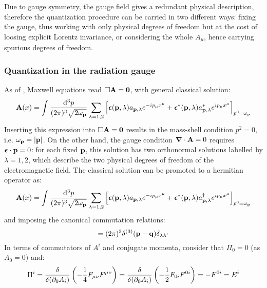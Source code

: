 Due to gauge symmetry, the gauge field gives a redundant physical description, therefore the quantization procedure can be carried in two different ways: fixing the gauge, thus working with only physical degrees of freedom but at the cost of loosing explicit Lorentz invariance, or considering the whole $ A_\mu $, hence carrying spurious degrees of freedom.

\subsubsection{Quantization in the radiation gauge}

As of , Maxwell equations  read $ \Box \mathbf{A} = \mathbf{0} $, with general classical solution:
\begin{equation*}
  \mathbf{A}(x) = \int \frac{\mathrm{d}^3p}{(2\pi)^3 \sqrt{2\omega_{\mathbf{p}}}} \sum_{\lambda = 1,2} \left[ \boldsymbol{\epsilon}(\mathbf{p},\lambda) a_{\mathbf{p},\lambda} e^{-i p_\mu x^\mu} + \boldsymbol{\epsilon}^*(\mathbf{p},\lambda)a^*_{\mathbf{p},\lambda} e^{i p_\mu x^\mu} \right]_{p^0 = \omega_{\mathbf{p}}}
\end{equation*}
Inserting this expression into $ \Box \mathbf{A} = \mathbf{0} $ results in the mass-shell condition $ p^2 = 0 $, i.e. $ \omega_{\mathbf{p}} = \left\lvert\mathbf{p}\right\rvert $. On the other hand, the gauge condition $ \boldsymbol{\nabla}\cdot \mathbf{A} = 0 $ requires $ \boldsymbol{\epsilon} \cdot \mathbf{p} = 0 $: for each fixed $ \mathbf{p} $, this solution has two orthonormal solutions labelled by $ \lambda = 1,2 $, which describe the two physical degrees of freedom of the electromagnetic field.
The classical solution can be promoted to a hermitian operator as:
\begin{equation}
  \mathbf{A}(x) = \int \frac{\mathrm{d}^3p}{(2\pi)^3 \sqrt{2\omega_{\mathbf{p}}}} \sum_{\lambda = 1,2} \left[ \boldsymbol{\epsilon}(\mathbf{p},\lambda) a_{\mathbf{p},\lambda} e^{-i p_\mu x^\mu} + \boldsymbol{\epsilon}^*(\mathbf{p},\lambda)a^\dagger_{\mathbf{p},\lambda} e^{i p_\mu x^\mu} \right]_{p^0 = \omega_{\mathbf{p}}}
  \label{eq:qed-four-rad}
\end{equation}
and imposing the canonical commutation relations:
\begin{equation}
  [a_{\ve{p},\lambda} , a_{\ve{q},\lambda'}\dg] = (2\pi)^3 \delta^{(3)}(\ve{p} - \ve{q}) \delta_{\lambda \lambda'}
\end{equation}
In terms of commutators of $ A^i $ and conjugate momenta, consider that $ \Pi_0 = 0 $ (as $ A_0 = 0 $) and\footnotemark:
\begin{equation*}
  \Pi^i = \frac{\delta}{\delta(\partial_0 A_i)} \left( -\frac{1}{4} F_{\mu \nu} F^{\mu \nu} \right) = \frac{\delta}{\delta(\partial_0 A_i)} \left( -\frac{1}{2} F_{0i} F^{0i} \right) = - F^{0i} = E^i
\end{equation*}
